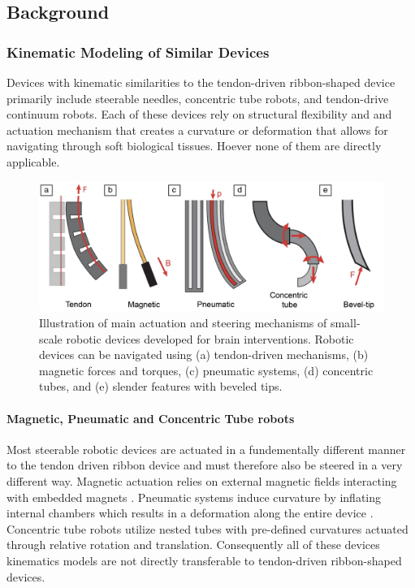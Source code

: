 
\subsection{Background}
\subsubsection{Kinematic Modeling of Similar Devices}
Devices with kinematic similarities to the tendon-driven ribbon-shaped device primarily include steerable needles, concentric tube robots, and tendon-drive continuum robots. Each of these devices rely on structural flexibility and and actuation mechanism that creates a curvature or deformation that allows for navigating through soft biological tissues. Hoever none of them are directly applicable.
\begin{figure} [H]
    \centering
    \includegraphics[width=0.9\linewidth]{images/steerableNeedles/actuations.png}
    \caption{Illustration of main actuation and steering mechanisms of small-scale robotic devices developed for brain interventions. Robotic devices can be navigated using (a) tendon-driven mechanisms, (b) magnetic forces and torques, (c) pneumatic systems,  (d) concentric tubes, and (e) slender features with beveled tips. \cite{noseda_small-scale_2024}}
    \label{fig:actuations}
\end{figure}

\paragraph*{Magnetic, Pneumatic and Concentric Tube robots}
Most steerable robotic devices are actuated in a fundementally different manner to the tendon driven ribbon device and must therefore also be steered in a very different way. Magnetic actuation relies on external magnetic fields interacting with embedded magnets . Pneumatic systems induce curvature by inflating internal chambers which results in a deformation along the entire device  . Concentric tube robots utilize nested tubes with pre-defined curvatures actuated through relative rotation and translation. Consequently all of these devices kinematics models are not directly transferable to tendon-driven ribbon-shaped devices.

